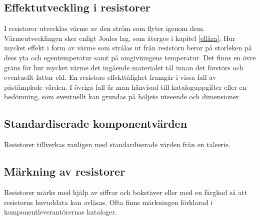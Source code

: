 \subsection{Effektutveckling i resistorer}

I resistorer utvecklas värme av den ström som flyter igenom dem. Värmeutvecklingen
sker enligt Joules lag, som återges i kapitel \ref{ellära}. Hur mycket effekt i form av
värme som strålas ut från resistorn beror på storleken på dess yta och
egentemperatur samt på omgivningens temperatur. Det finns en övre gräns för hur
mycket värme det ingående materialet tål innan det förstörs och eventuellt fattar
eld. En resistors effekttålighet framgår i vissa fall av påstämplade värden.
I övriga fall är man hänvisad till kataloguppgifter eller en bedömning, som
eventuellt kan grundas på höljets utseende och dimensioner.

\subsection{Standardiserade komponentvärden}

Resistorer tillverkas vanligen med standardiserade värden från en talserie.

\subsection{Märkning av resistorer}

Resistorer märks med hjälp av siffror och bokstäver eller med en färgkod så att
resistorns huvuddata kan avläsas. Ofta finns märkningen förklarad i 
komponentleverantörernas kataloger.
